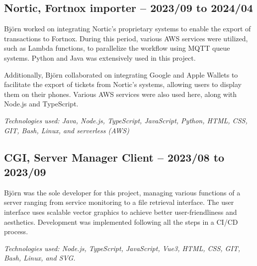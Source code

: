 \subsection*{\textcolor{colorTitelErfarenhet}{Nortic, Fortnox importer – 2023/09 to 2024/04}}
Björn worked on integrating Nortic's proprietary systems to enable the export of transactions to Fortnox. During this period, various AWS services were utilized, such as Lambda functions, to parallelize the workflow using MQTT queue systems. Python and Java was extensively used in this project.

Additionally, Björn collaborated on integrating Google and Apple Wallets to facilitate the export of tickets from Nortic's systems, allowing users to display them on their phones. Various AWS services were also used here, along with Node.js and TypeScript.

\vspace{5pt}\textit{Technologies used: Java, Node.js, TypeScript, JavaScript, Python, HTML, CSS, GIT, Bash, Linux, and serverless (AWS)}

\vspace{15pt} %
\subsection*{\textcolor{colorTitelErfarenhet}{CGI, Server Manager Client – 2023/08 to 2023/09}}
Björn was the sole developer for this project, managing various functions of a server ranging from service monitoring to a file retrieval interface. The user interface uses scalable vector graphics to achieve better user-friendliness and aesthetics. Development was implemented following all the steps in a CI/CD process.

\vspace{5pt}\textit{Technologies used: Node.js, TypeScript, JavaScript, Vue3, HTML, CSS, GIT, Bash, Linux, and SVG.}